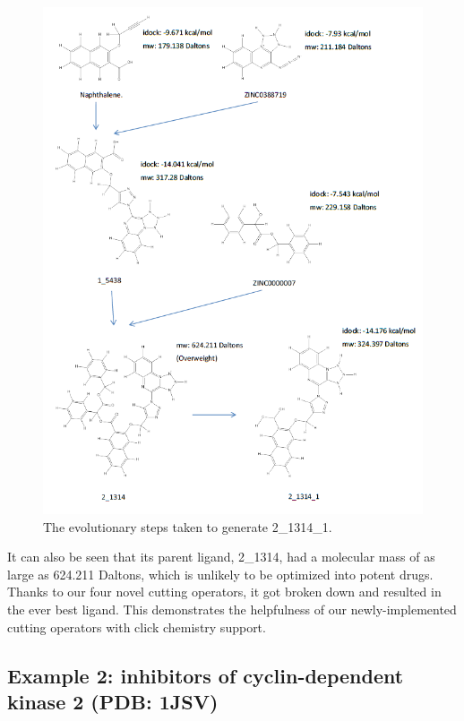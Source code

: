 \begin{figure}
\begin{center}
\includegraphics[width=\linewidth]{../isyn/2_1314_1.png}
\end{center}
\caption{The evolutionary steps taken to generate 2\_1314\_1.}
\label{fig:2_1314_1}
\end{figure}

It can also be seen that its parent ligand, 2\_1314, had a molecular mass of as large as 624.211 Daltons, which is unlikely to be optimized into potent drugs. Thanks to our four novel cutting operators, it got broken down and resulted in the ever best ligand. This demonstrates the helpfulness of our newly-implemented cutting operators with click chemistry support.

\subsection{Example 2: inhibitors of cyclin-dependent kinase 2 (PDB: 1JSV)}

